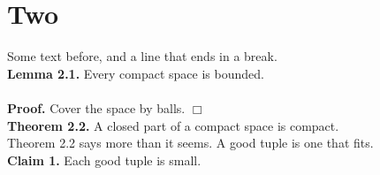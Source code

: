 \documentclass{article}
\begin{document}
\section{Two}
Some text before, and a line that ends in a break.\\
{\bf{Lemma 2.1.}} Every compact space is bounded.
\\
\\
{\bf{Proof.}} Cover the space by balls. $\Box$\\
{\bf{Theorem 2.2.}} A closed part of a compact space is compact.\\
Theorem 2.2 says more than it seems. A good tuple is one that fits.\\[5pt] \noindent
\textbf{Claim 1.} Each good tuple is small.
\end{document}
